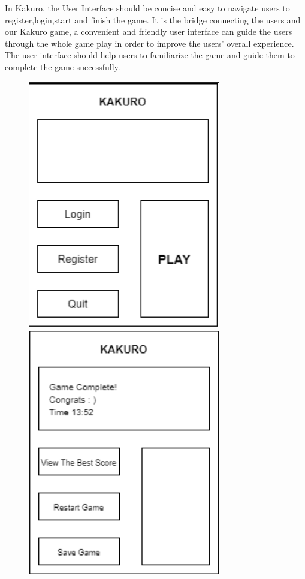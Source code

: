 \documentclass[12pt]{article}
\begin{document}
In Kakuro, the User Interface should be concise and easy to navigate users to register,login,start and finish the game. It is the bridge connecting the users and our Kakuro game, a convenient and friendly user interface can guide the users through the whole game play in order to improve the users' overall experience. The user interface should help users to familiarize the game and guide them to complete the game successfully.

\begin{figure}[htbp]
    \centering
    \includegraphics[scale=0.5]{images/UI2.png}
      \includegraphics[scale=0.5]{images/UI3.png}

\end{figure}
\end{document}
